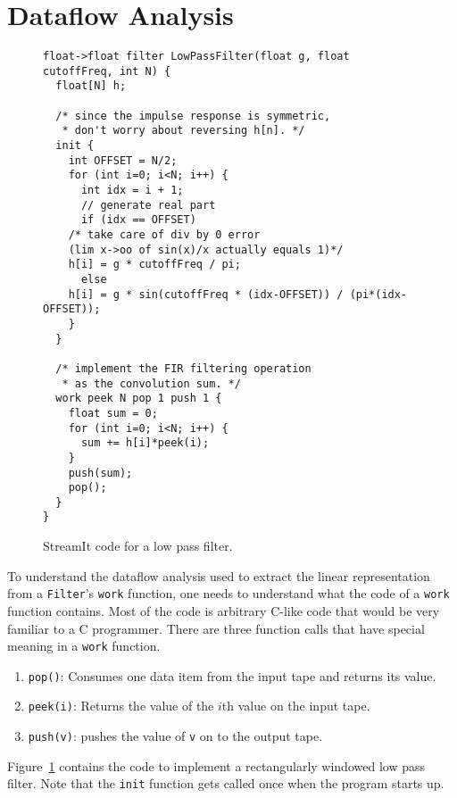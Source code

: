 \section{Dataflow Analysis}
\begin{figure}[t]
\scriptsize
\begin{verbatim}
float->float filter LowPassFilter(float g, float cutoffFreq, int N) {
  float[N] h;

  /* since the impulse response is symmetric, 
   * don't worry about reversing h[n]. */
  init {
    int OFFSET = N/2;
    for (int i=0; i<N; i++) {
      int idx = i + 1;
      // generate real part
      if (idx == OFFSET) 
	/* take care of div by 0 error 
	(lim x->oo of sin(x)/x actually equals 1)*/
	h[i] = g * cutoffFreq / pi; 
      else 
	h[i] = g * sin(cutoffFreq * (idx-OFFSET)) / (pi*(idx-OFFSET));
    }
  }

  /* implement the FIR filtering operation 
   * as the convolution sum. */
  work peek N pop 1 push 1 {
    float sum = 0;
    for (int i=0; i<N; i++) { 
      sum += h[i]*peek(i);
    }
    push(sum);
    pop();
  }
}

\end{verbatim}
\vspace{-12pt}
\caption{\protect\small StreamIt code for a low pass filter.
\protect\label{fig:lowpasscode}}
\vspace{-12pt}
\end{figure}


To understand the dataflow analysis used to extract the linear representation from
a {\tt Filter}'s {\tt work} function, one needs to understand what the code of a 
{\tt work} function contains. Most of the code is arbitrary C-like code that would
be very familiar to a C programmer. There are three function calls that have special 
meaning in a {\tt work} function.

\begin{enumerate}
\item {\tt pop()}: Consumes one data item from the input tape and returns its value.
\item {\tt peek(i)}: Returns the value of the $i$th value on the input tape.
\item {\tt push(v)}: pushes the value of {\tt v} on to the output tape.
\end{enumerate}


Figure~\ref{fig:lowpasscode} contains the code to implement a rectangularly windowed 
low pass filter. Note that the {\tt init} function gets called once when the program
starts up.
 
